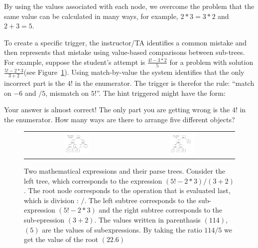 \documentclass{sigchi}
\begin{document}
By using the values associated with each node, we overcome the problem that the same value can be calculated in many ways, for example, $2*3 = 3*2$ and $2+3=5$. 

To create a specific trigger, the instructor/TA identifies a common
mistake and then represents that mistake using value-based comparisons between sub-trees. For example,
suppose the student's attempt is $\frac{4!-3*2}{5}$
for a problem with solution $\frac{5!-2*3}{3+2}$(see Figure~\ref{fig:parse_tree}). Using match-by-value the system identifies that the only incorrect part is the $4!$ in the enumerator. The trigger is therefor the rule: ``match on $-6$ and $/5$, mismatch on $5!$''. The hint triggered might have the form:
\begin{displayquote}
Your answer is almost correct! The only part you are getting wrong is
the $4!$ in the enumerator. How many ways are there to arrange five different objects?
\end{displayquote}


\begin{figure}[ht]
  \centering
   \begin{tabular}{c c}
		\includegraphics[width=0.25\textwidth]{image/ParseTrees1.png} &
		\includegraphics[width=0.25\textwidth]{image/ParseTrees2.png}
	\end{tabular}
   \caption{Two mathematical expressions and their parse
     trees. Consider the left tree, which corresponds to the
     expression $(5!-2*3)/(3+2)$. The root node corresponds to the
     operation that is evaluated last, which is division : $/$. The
     left subtree corresponds to the sub-expression $(5!-2*3)$ and the
     right subtree corresponds to the sub-epression $(3+2)$. The
     values written in parenthasis $(114)$,$(5)$ are the values of
     subexpressions. By taking the ratio $114/5$ we get the value of
     the root $(22.6)$}
   \label{fig:parse_tree}
\end{figure}
\end{document}
